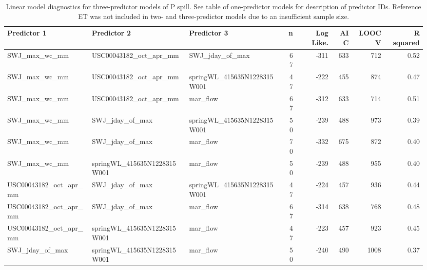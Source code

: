 \documentclass[hess, manuscript]{copernicus}
\begin{document}
\begin{table}[ht]
\centering
\caption{Linear model diagnostics for three-predictor models of P spill. See table of one-predictor models for description of predictor IDs. Reference ET was not included in two- and three-predictor models due to an insufficient sample size.} 
\label{tab:pspill_tab_3pred}
\begingroup\fontsize{8pt}{9pt}\selectfont
\begin{tabular}{lllrrrrr}
  \hline
Predictor 1 & Predictor 2 & Predictor 3 & n & Log Like. & AIC & LOOCV & R squared \\ 
  \hline
SWJ\_max\_wc\_mm & USC00043182\_oct\_apr\_mm & SWJ\_jday\_of\_max & 67 & -311 & 633 & 712 & 0.52 \\ 
  SWJ\_max\_wc\_mm & USC00043182\_oct\_apr\_mm & springWL\_415635N1228315W001 & 47 & -222 & 455 & 874 & 0.47 \\ 
  SWJ\_max\_wc\_mm & USC00043182\_oct\_apr\_mm & mar\_flow & 67 & -312 & 633 & 714 & 0.51 \\ 
  SWJ\_max\_wc\_mm & SWJ\_jday\_of\_max & springWL\_415635N1228315W001 & 50 & -239 & 488 & 973 & 0.39 \\ 
  SWJ\_max\_wc\_mm & SWJ\_jday\_of\_max & mar\_flow & 70 & -332 & 675 & 872 & 0.40 \\ 
  SWJ\_max\_wc\_mm & springWL\_415635N1228315W001 & mar\_flow & 50 & -239 & 488 & 955 & 0.40 \\ 
  USC00043182\_oct\_apr\_mm & SWJ\_jday\_of\_max & springWL\_415635N1228315W001 & 47 & -224 & 457 & 936 & 0.44 \\ 
  USC00043182\_oct\_apr\_mm & SWJ\_jday\_of\_max & mar\_flow & 67 & -314 & 638 & 768 & 0.48 \\ 
  USC00043182\_oct\_apr\_mm & springWL\_415635N1228315W001 & mar\_flow & 47 & -223 & 457 & 923 & 0.45 \\ 
  SWJ\_jday\_of\_max & springWL\_415635N1228315W001 & mar\_flow & 50 & -240 & 490 & 1008 & 0.37 \\ 
   \hline
\end{tabular}
\endgroup
\end{table}
\end{document}
